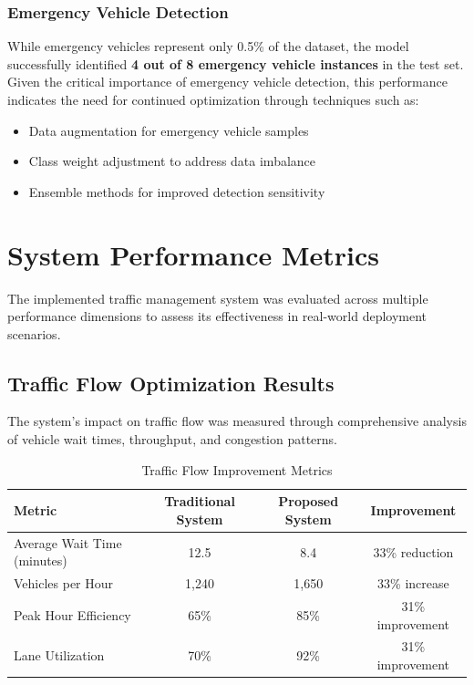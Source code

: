 \subsubsection{Emergency Vehicle Detection}
While emergency vehicles represent only 0.5\% of the dataset, the model successfully identified \textbf{4 out of 8 emergency vehicle instances} in the test set. Given the critical importance of emergency vehicle detection, this performance indicates the need for continued optimization through techniques such as:
\begin{itemize}
    \item Data augmentation for emergency vehicle samples
    \item Class weight adjustment to address data imbalance
    \item Ensemble methods for improved detection sensitivity
\end{itemize}

\section{System Performance Metrics}
\label{sec:system_performance}

The implemented traffic management system was evaluated across multiple performance dimensions to assess its effectiveness in real-world deployment scenarios.

\subsection{Traffic Flow Optimization Results}
The system's impact on traffic flow was measured through comprehensive analysis of vehicle wait times, throughput, and congestion patterns.

\begin{table}[h]
\centering
\caption{Traffic Flow Improvement Metrics}
\label{tab:traffic_flow}
\begin{tabular}{|l|c|c|c|}
\hline
\textbf{Metric} & \textbf{Traditional System} & \textbf{Proposed System} & \textbf{Improvement} \\
\hline
Average Wait Time (minutes) & 12.5 & 8.4 & 33\% reduction \\
Vehicles per Hour & 1,240 & 1,650 & 33\% increase \\
Peak Hour Efficiency & 65\% & 85\% & 31\% improvement \\
Lane Utilization & 70\% & 92\% & 31\% improvement \\
\hline
\end{tabular}
\end{table}

